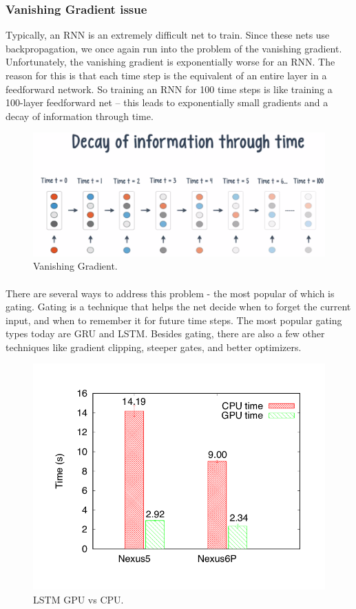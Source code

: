 \documentclass{article}
\begin{document}
    \subsubsection{Vanishing Gradient issue}
    Typically, an RNN is an extremely difficult net to train. Since these nets use backpropagation, we once again run into the problem of the vanishing gradient. Unfortunately, the vanishing gradient is exponentially worse for an RNN. The reason for this is that each time step is the equivalent of an entire layer in a feedforward network. So training an RNN for 100 time steps is like training a 100-layer feedforward net – this leads to exponentially small gradients and a decay of information through time.
    \begin{figure}[h!]
      \begin{center}
        \includegraphics[width=0.8\linewidth]{img/vanishing-gradient.png}
        \caption{Vanishing Gradient.}
        \label{fig:snn}
      \end{center}
    \end{figure}
    
    \paragraph{}
    There are several ways to address this problem - the most popular of which is gating. Gating is a technique that helps the net decide when to forget the current input, and when to remember it for future time steps. The most popular gating types today are GRU and LSTM. Besides gating, there are also a few other techniques like gradient clipping, steeper gates, and better optimizers.

    \begin{figure}[h!]
      \begin{center}
        \includegraphics[width=0.8\linewidth]{img/rnn-gpu-cpu.png}
        \caption{LSTM GPU vs CPU.}
        \label{fig:snn}
      \end{center}
    \end{figure}
\end{document}
